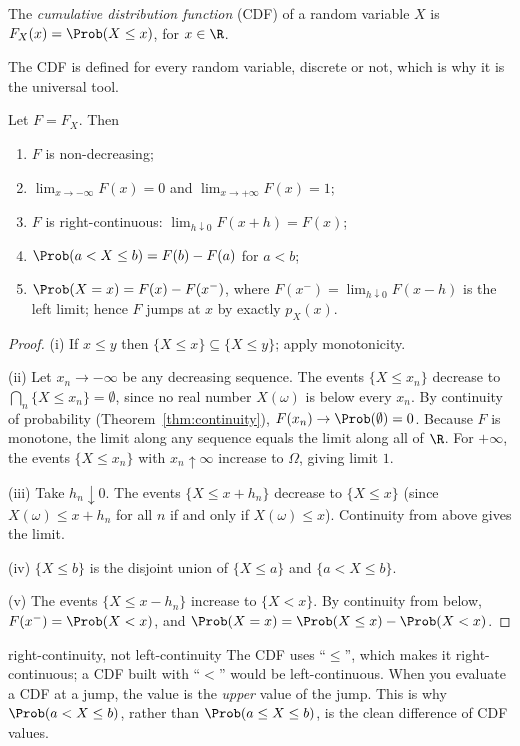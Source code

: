 \begin{definition}
The \emph{cumulative distribution function} (CDF) of a random variable $X$ is
$F_X(x)=\Prob(X\le x)$, for $x\in\R$.
\end{definition}

The CDF is defined for every random variable, discrete or not, which is why it is
the universal tool.

\begin{theorem}\label{thm:cdf}
Let $F=F_X$. Then
\begin{enumerate}[label=(\roman*)]
\item $F$ is non-decreasing;
\item $\lim_{x\to-\infty}F(x)=0$ and $\lim_{x\to+\infty}F(x)=1$;
\item $F$ is right-continuous: $\lim_{h\downarrow0}F(x+h)=F(x)$;
\item $\Prob(a<X\le b)=F(b)-F(a)$ for $a<b$;
\item $\Prob(X=x)=F(x)-F(x^-)$, where $F(x^-)=\lim_{h\downarrow0}F(x-h)$ is the left
limit; hence $F$ jumps at $x$ by exactly $p_X(x)$.
\end{enumerate}
\end{theorem}
\begin{proof}
(i) If $x\le y$ then $\{X\le x\}\subseteq\{X\le y\}$; apply monotonicity.

(ii) Let $x_n\to-\infty$ be any decreasing sequence. The events $\{X\le x_n\}$
decrease to $\bigcap_n\{X\le x_n\}=\emptyset$, since no real number $X(\omega)$ is
below every $x_n$. By continuity of probability (Theorem~\ref{thm:continuity}),
$F(x_n)\to\Prob(\emptyset)=0$. Because $F$ is monotone, the limit along any
sequence equals the limit along all of $\R$. For $+\infty$, the events
$\{X\le x_n\}$ with $x_n\uparrow\infty$ increase to $\Omega$, giving limit $1$.

(iii) Take $h_n\downarrow0$. The events $\{X\le x+h_n\}$ decrease to
$\{X\le x\}$ (since $X(\omega)\le x+h_n$ for all $n$ if and only if
$X(\omega)\le x$). Continuity from above gives the limit.

(iv) $\{X\le b\}$ is the disjoint union of $\{X\le a\}$ and $\{a<X\le b\}$.

(v) The events $\{X\le x-h_n\}$ increase to $\{X<x\}$. By continuity from below,
$F(x^-)=\Prob(X<x)$, and $\Prob(X=x)=\Prob(X\le x)-\Prob(X<x)$.
\end{proof}

\begin{nuance}{right-continuity, not left-continuity}
The CDF uses ``$\le$'', which makes it right-continuous; a CDF built with
``$<$'' would be left-continuous. When you evaluate a CDF at a jump, the value is
the \emph{upper} value of the jump. This is why $\Prob(a<X\le b)$, rather than
$\Prob(a\le X\le b)$, is the clean difference of CDF values.
\end{nuance}


